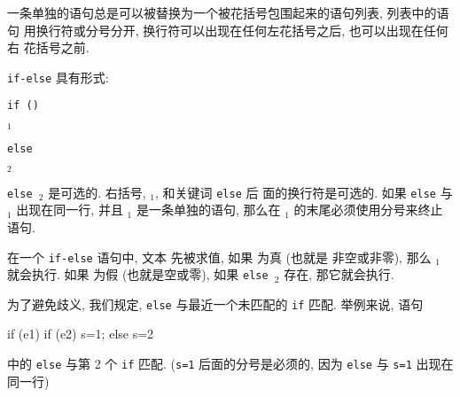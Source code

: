 一条单独的语句总是可以被替换为一个被花括号包围起来的语句列表, 列表中的语句
用换行符或分号分开, 换行符可以出现在任何左花括号之后, 也可以出现在任何右
花括号之前.

\verb'if-else' 具有形式:
\begin{pattern}
    \verb'if ('\expr\verb')' \par
    \indent\indent\stmt$_1$ \par
    \verb'else' \par
    \indent\indent\stmt$_2$ \par
\end{pattern}
\verb'else '\stmt$_2$ 是可选的. 右括号, \stmt$_1$, 和关键词 \verb'else' 后
面的换行符是可选的. 如果 \verb'else' 与 \stmt$_1$ 出现在同一行, 并且
\stmt$_1$ 是一条单独的语句, 那么在 \stmt$_1$ 的末尾必须使用分号来终止语句.

在一个 \verb'if-else' 语句中, 文本 \expr 先被求值, 如果 \expr 为真 (也就是
非空或非零), 那么 \stmt$_1$ 就会执行. 如果 \expr 为假 (也就是空或零),
如果 \verb'else '\stmt$_2$ 存在, 那它就会执行.

为了避免歧义, 我们规定, \verb'else' 与最近一个未匹配的 \verb'if' 匹配.
举例来说, 语句
\begin{awkcode}
    if (e1) if (e2) s=1; else s=2
\end{awkcode}
中的 \verb'else' 与第 2 个 \verb'if' 匹配. (\verb's=1' 后面的分号是必须的,
因为 \verb'else' 与 \verb's=1' 出现在同一行)


